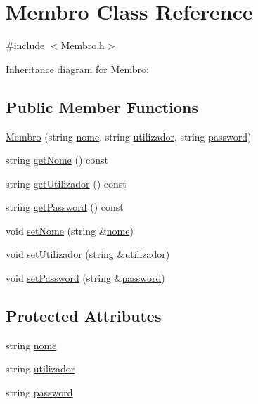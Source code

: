 \hypertarget{class_membro}{\section{Membro Class Reference}
\label{class_membro}
}


{\ttfamily \#include $<$Membro.\+h$>$}



Inheritance diagram for Membro\+:
\subsection*{Public Member Functions}
\begin{DoxyCompactItemize}
\item 
\hyperlink{class_membro_a2dc48d0c0febf2d3270128734bdce7d0}{Membro} (string \hyperlink{class_membro_a2598bbe34ae32a98f41468b2202a9555}{nome}, string \hyperlink{class_membro_a42cc733ff94ec8d1bbfdacc62dfbb0e7}{utilizador}, string \hyperlink{class_membro_ae2b12fc3e91efc674c07e735edf4ac21}{password})
\item 
string \hyperlink{class_membro_af7cfd42d45960183ccf1002246cb0bd2}{get\+Nome} () const 
\item 
string \hyperlink{class_membro_ae124b54c2b8572e531c873788263222d}{get\+Utilizador} () const 
\item 
string \hyperlink{class_membro_af9c84eb5f83b1fd64d4c542f419d6953}{get\+Password} () const 
\item 
void \hyperlink{class_membro_a87f95f3869ef8ce4cfaf673cff30cdcc}{set\+Nome} (string \&\hyperlink{class_membro_a2598bbe34ae32a98f41468b2202a9555}{nome})
\item 
void \hyperlink{class_membro_ac0ce078ab4d7d5a72e370ea6335e8eef}{set\+Utilizador} (string \&\hyperlink{class_membro_a42cc733ff94ec8d1bbfdacc62dfbb0e7}{utilizador})
\item 
void \hyperlink{class_membro_ab5a7b1734090d146bb39f8cfa52be006}{set\+Password} (string \&\hyperlink{class_membro_ae2b12fc3e91efc674c07e735edf4ac21}{password})
\end{DoxyCompactItemize}
\subsection*{Protected Attributes}
\begin{DoxyCompactItemize}
\item 
string \hyperlink{class_membro_a2598bbe34ae32a98f41468b2202a9555}{nome}
\item 
string \hyperlink{class_membro_a42cc733ff94ec8d1bbfdacc62dfbb0e7}{utilizador}
\item 
string \hyperlink{class_membro_ae2b12fc3e91efc674c07e735edf4ac21}{password}
\end{DoxyCompactItemize}


